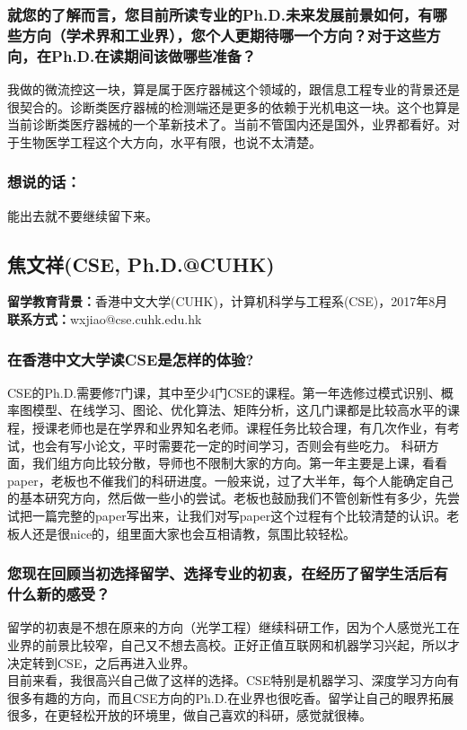 \documentclass[a4paper,UTF8]{book}
\begin{document}
    \subsubsection*{就您的了解而言，您目前所读专业的Ph.D.未来发展前景如何，有哪些方向（学术界和工业界），您个人更期待哪一个方向？对于这些方向，在Ph.D.在读期间该做哪些准备？}
    我做的微流控这一块，算是属于医疗器械这个领域的，跟信息工程专业的背景还是很契合的。诊断类医疗器械的检测端还是更多的依赖于光机电这一块。这个也算是当前诊断类医疗器械的一个革新技术了。当前不管国内还是国外，业界都看好。对于生物医学工程这个大方向，水平有限，也说不太清楚。
                    
    \subsubsection{想说的话：}
    能出去就不要继续留下来。


\clearpage
\subsection{焦文祥(CSE, Ph.D.@CUHK)}
    \textbf{留学教育背景：}香港中文大学(CUHK)，计算机科学与工程系(CSE)，2017年8月\\
    \textbf{联系方式：}wxjiao@cse.cuhk.edu.hk

    \subsubsection*{在香港中文大学读CSE是怎样的体验?}
    CSE的Ph.D.需要修7门课，其中至少4门CSE的课程。第一年选修过模式识别、概率图模型、在线学习、图论、优化算法、矩阵分析，这几门课都是比较高水平的课程，授课老师也是在学界和业界知名老师。课程任务比较合理，有几次作业，有考试，也会有写小论文，平时需要花一定的时间学习，否则会有些吃力。
    科研方面，我们组方向比较分散，导师也不限制大家的方向。第一年主要是上课，看看paper，老板也不催我们的科研进度。一般来说，过了大半年，每个人能确定自己的基本研究方向，然后做一些小的尝试。老板也鼓励我们不管创新性有多少，先尝试把一篇完整的paper写出来，让我们对写paper这个过程有个比较清楚的认识。老板人还是很nice的，组里面大家也会互相请教，氛围比较轻松。

    
    \subsubsection*{您现在回顾当初选择留学、选择专业的初衷，在经历了留学生活后有什么新的感受？}
    留学的初衷是不想在原来的方向（光学工程）继续科研工作，因为个人感觉光工在业界的前景比较窄，自己又不想去高校。正好正值互联网和机器学习兴起，所以才决定转到CSE，之后再进入业界。\\
    目前来看，我很高兴自己做了这样的选择。CSE特别是机器学习、深度学习方向有很多有趣的方向，而且CSE方向的Ph.D.在业界也很吃香。留学让自己的眼界拓展很多，在更轻松开放的环境里，做自己喜欢的科研，感觉就很棒。
\end{document}
